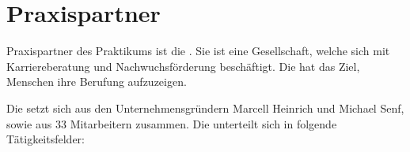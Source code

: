 
\chapter{Praxispartner}




Praxispartner des Praktikums ist die . Sie ist eine Gesellschaft, welche sich mit Karriereberatung und Nachwuchsförderung beschäftigt. Die  hat das Ziel, Menschen ihre Berufung aufzuzeigen.\\
\parencite{hero-society}

Die  setzt sich aus den Unternehmensgründern Marcell Heinrich und Michael Senf, sowie aus 33 Mitarbeitern zusammen. Die  unterteilt sich in folgende Tätigkeitsfelder:

